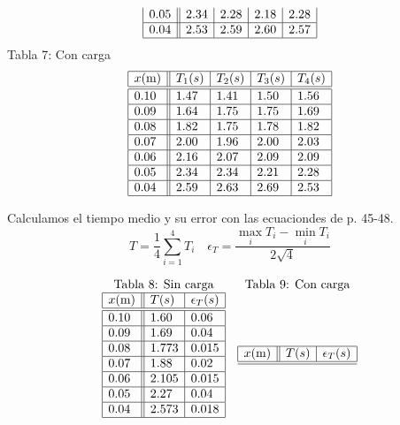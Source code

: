 \documentclass{article}
\begin{document}
\begin{multicols}{2}
\begin{center}
$$\begin{array}{|l||l|l|l|l|}
        0.05  & 2.34 & 2.28 & 2.18 & 2.28  \\ \hline
        0.04  & 2.53 & 2.59 & 2.60 & 2.57  \\ \hline
        \end{array}
    $$
    Tabla 7: Con carga
    $$
    \begin{array}{|l||l|l|l|l|} \hline
        x\text{(m)} & T_1\text(s) & T_2\text(s) & T_3\text(s) & T_4\text(s) \\ \hline \hline
        0.10 & 1.47 & 1.41 & 1.50 & 1.56  \\ \hline
        0.09 & 1.64 & 1.75 & 1.75 & 1.69  \\ \hline
        0.08 & 1.82 & 1.75 & 1.78 & 1.82  \\ \hline
        0.07 & 2.00 & 1.96 & 2.00 & 2.03  \\ \hline
        0.06 & 2.16 & 2.07 & 2.09 & 2.09  \\ \hline
        0.05 & 2.34 & 2.34 & 2.21 & 2.28  \\ \hline
        0.04 & 2.59 & 2.63 & 2.69 & 2.53  \\ \hline
    \end{array}
    $$
\end{center}
Calculamos el tiempo medio y su error con las ecuaciondes de \cite{manual} p. 45-48.
$$
T = \frac{1}{4} \sum_{i=1}^4 T_i \quad \epsilon_T = \frac{\max_i T_i - \min_i T_i}{2\sqrt{4}}
$$
\begin{center}
    $$
    \begin{array}{cc}
        \text{Tabla 8: Sin carga} & \text{Tabla 9: Con carga} \\
    \begin{array}{|l||l|l|} \hline
        x\text{(m)} & T\text(s) & \epsilon_T\text(s) \\ \hline \hline
        0.10 & 1.60  & 0.06   \\ \hline
        0.09 & 1.69  & 0.04   \\ \hline
        0.08 & 1.773 & 0.015  \\ \hline
        0.07 & 1.88  & 0.02   \\ \hline
        0.06 & 2.105 & 0.015  \\ \hline
        0.05 & 2.27  & 0.04   \\ \hline
        0.04 & 2.573 & 0.018  \\ \hline
        \end{array}
    &
    \begin{array}{|l||l|l|} \hline
        x\text{(m)} & T\text(s) & \epsilon_T\text(s) \\ \hline \hline

\end{array}
\end{array}$$
\end{center}
\end{multicols}
\end{document}
